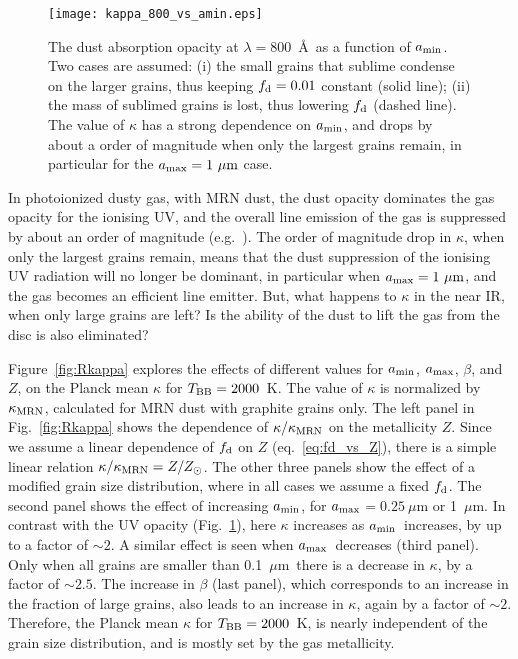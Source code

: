 \documentclass[a4paper,fleqn,usenatbib]{mnras}
\newcommand{\amin}{\mbox{$a_{\rm min}$}}
\newcommand{\amax}{\mbox{$a_{\rm max}$}}
\newcommand{\mic}{\mbox{$\mu$m}}
\begin{document}
\begin{figure}
\texttt{[image: kappa\_800\_vs\_amin.eps]}
\caption{The dust absorption opacity at $\lambda=800$~\AA\ as a function of \amin. Two cases are assumed: (i) the small grains that sublime condense on the larger grains, thus keeping $f_{\rm d}=0.01$ constant (solid line); 
(ii) the mass of sublimed grains is lost, thus lowering $f_{\rm d}$ (dashed line). The value of $\kappa$ has a strong dependence on \amin, and drops by about a order of magnitude when only the largest grains remain, in particular for the $\amax=1~\mic$ case.}
\label{fig:kappa_800_vs_amin}
\end{figure}


In photoionized dusty gas, with MRN dust, the dust opacity dominates the gas opacity for the ionising UV,
and the overall line emission of the gas is suppressed by about an order of magnitude
(e.g.\ \citealt{paperI}). The order of magnitude drop in $\kappa$, when only the
largest grains remain, means that the dust suppression
of the ionising UV radiation will no longer be dominant, in particular when  $\amax=1~\mic$, and the
gas becomes an efficient line emitter. But, what happens to $\kappa$ in the near IR, when only large grains are left?  Is the ability of the dust to lift the gas from the disc is also eliminated? 

Figure~\ref{fig:Rkappa} explores the effects of different values for \amin, \amax, $\beta$, and  $Z$, on the Planck mean $\kappa$ for $T_{\rm BB}=2000$~K. The value of $\kappa$ 
is normalized by $\kappa_{\rm MRN}$, calculated for MRN dust with graphite grains only. The left panel in Fig.~\ref{fig:Rkappa} 
shows the dependence of $\kappa/\kappa_{\rm MRN}$ on the metallicity $Z$. Since we assume a linear dependence of
$f_{\rm d}$ on $Z$ (eq.~\ref{eq:fd_vs_Z}), there is a simple linear relation $\kappa/\kappa_{\rm MRN}=Z/Z_{\odot}$. The other three
panels show the effect of a modified grain size distribution, where in all cases we assume a fixed $f_{\rm d}$. The second panel shows the effect of increasing \amin, for  
\amax $=0.25~\mic$ or 1~$\mic$. In contrast with the UV opacity (Fig.~\ref{fig:kappa_800_vs_amin}), here $\kappa$ increases
as \amin\ increases, by up to a factor of $\sim 2$. A similar effect is seen when \amax\ decreases (third panel). 
Only when all grains are smaller
than 0.1~\mic\ there is a decrease in $\kappa$, by a factor of $\sim 2.5$. The increase in $\beta$ (last panel),
which corresponds to an increase in the fraction of large grains, also leads to an increase in $\kappa$, again by a factor
of $\sim 2$. Therefore, the Planck mean $\kappa$ for $T_{\rm BB}=2000$~K, is nearly independent of the grain size distribution, and is mostly set by the gas metallicity. 
\end{document}
